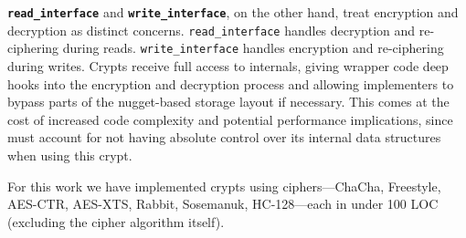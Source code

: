 
{\bf \texttt{read\_interface}} and {\bf \texttt{write\_interface}}, on the other
hand, treat encryption and decryption as distinct concerns.
\texttt{read\_interface} handles decryption and re-ciphering during reads.
\texttt{write\_interface} handles encryption and re-ciphering during writes.
Crypts receive full access to \sys internals, giving wrapper code deep hooks
into the encryption and decryption process and allowing implementers to bypass
parts of the nugget-based storage layout if necessary. This comes at the cost of
increased code complexity and potential performance implications, since \sys
must account for not having absolute control over its internal data structures
when using this crypt.

For this work we have implemented \numConfigs crypts using \numCiphers
ciphers---ChaCha, Freestyle, AES-CTR, AES-XTS, Rabbit, Sosemanuk,
HC-128---each in under 100 LOC (excluding the cipher algorithm
itself). 

